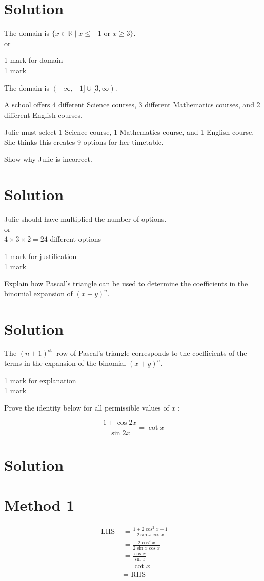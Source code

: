 \documentclass[10pt]{article}
\begin{document}
\section*{Solution}
The domain is $\{x \in \mathbb{R} \mid x \leq-1$ or $x \geq 3\}$.\\
or

1 mark for domain\\
1 mark

The domain is $(-\infty,-1] \cup[3, \infty)$.

A school offers 4 different Science courses, 3 different Mathematics courses, and 2 different English courses.

Julie must select 1 Science course, 1 Mathematics course, and 1 English course. She thinks this creates 9 options for her timetable.

Show why Julie is incorrect.

\section*{Solution}
Julie should have multiplied the number of options.\\
or\\
$4 \times 3 \times 2=24$ different options

1 mark for justification\\
1 mark

Explain how Pascal's triangle can be used to determine the coefficients in the binomial expansion of $(x+y)^{n}$.

\section*{Solution}
The $(n+1)^{\text {st }}$ row of Pascal's triangle corresponds to the coefficients of the terms in the expansion of the binomial $(x+y)^{n}$.

1 mark for explanation\\
1 mark

Prove the identity below for all permissible values of $x$ :

$$
\frac{1+\cos 2 x}{\sin 2 x}=\cot x
$$

\section*{Solution}
\section*{Method 1}
$$
\begin{aligned}
\text { LHS } & =\frac{1+2 \cos ^{2} x-1}{2 \sin x \cos x} \\
& =\frac{2 \cos ^{2} x}{2 \sin x \cos x} \\
& =\frac{\cos x}{\sin x} \\
& =\cot x \\
& =\text { RHS }
\end{aligned}
$$
\end{document}
